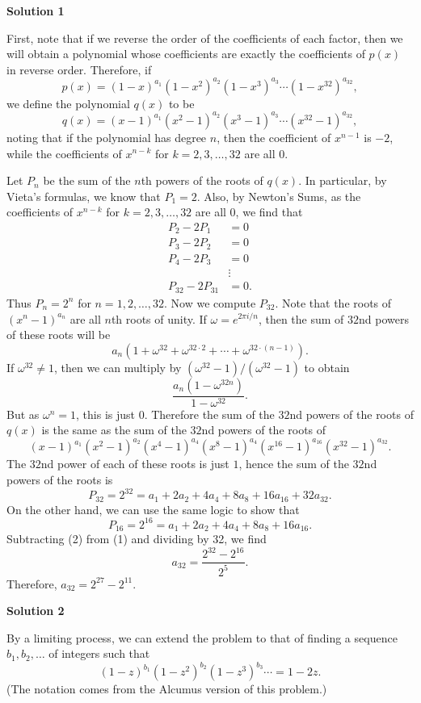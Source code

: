 \begin{enumerate}
 



\textbf{Solution 1}

First, note that if we reverse the order of the coefficients of each factor, then we will obtain a polynomial whose coefficients are exactly the coefficients of $p(x)$ in reverse order. Therefore, if
 \[p(x)=(1-x)^{a_1}(1-x^2)^{a_2}(1-x^3)^{a_3}\cdots(1-x^{32})^{a_{32}},\]we define the polynomial $q(x)$ to be
 \[q(x)=(x-1)^{a_1}(x^2-1)^{a_2}(x^3-1)^{a_3}\cdots(x^{32}-1)^{a_{32}},\]noting that if the polynomial has degree $n$, then the coefficient of $x^{n-1}$ is $-2$, while the coefficients of $x^{n-k}$ for $k=2,3,\dots, 32$ are all $0$.

 Let $P_n$ be the sum of the $n$th powers of the roots of $q(x)$. In particular, by Vieta's formulas, we know that $P_1=2$. Also, by Newton's Sums, as the coefficients of $x^{n-k}$ for $k=2,3,\dots,32$ are all $0$, we find that
 \begin{align*} P_2-2P_1&=0\\ P_3-2P_2&=0\\ P_4-2P_3&=0\\ &\vdots\\ P_{32}-2P_{31}&=0. \end{align*}
Thus $P_n=2^n$ for $n=1,2,\dots, 32$. Now we compute $P_{32}$. Note that the roots of $(x^n-1)^{a_n}$ are all $n$th roots of unity. If $\omega=e^{2\pi i/n}$, then the sum of $32$nd powers of these roots will be
 \[a_n(1+\omega^{32}+\omega^{32\cdot 2}+\cdots+\omega^{32\cdot(n-1)}).\]If $\omega^{32}\ne 1$, then we can multiply by $(\omega^{32}-1)/(\omega^{32}-1)$ to obtain
 \[\frac{a_n(1-\omega^{32n})}{1-\omega^{32}}.\]But as $\omega^n=1$, this is just $0$. Therefore the sum of the $32$nd powers of the roots of $q(x)$ is the same as the sum of the $32$nd powers of the roots of
 \[(x-1)^{a_1}(x^2-1)^{a_2}(x^4-1)^{a_4}(x^{8}-1)^{a_4}(x^{16}-1)^{a_{16}}(x^{32}-1)^{a_{32}}.\]The $32$nd power of each of these roots is just $1$, hence the sum of the $32$nd powers of the roots is
 \[P_{32}=2^{32}=a_1+2a_2+4a_4+8a_8+16a_{16}+32a_{32}.\tag{1}\]On the other hand, we can use the same logic to show that
 \[P_{16}=2^{16}=a_1+2a_2+4a_4+8a_8+16a_{16}.\tag{2}\]Subtracting (2) from (1) and dividing by 32, we find
 \[a_{32}=\frac{2^{32}-2^{16}}{2^5}.\]Therefore, $a_{32}=2^{27}-2^{11}$.

 


 



\textbf{Solution 2}

By a limiting process, we can extend the problem to that of finding a sequence $b_1, b_2, \ldots$ of integers such that
 \[(1 - z)^{b_1}(1 - z^2)^{b_2}(1 - z^3)^{b_3}\cdots = 1 - 2z.\](The notation comes from the Alcumus version of this problem.)


\end{enumerate}
